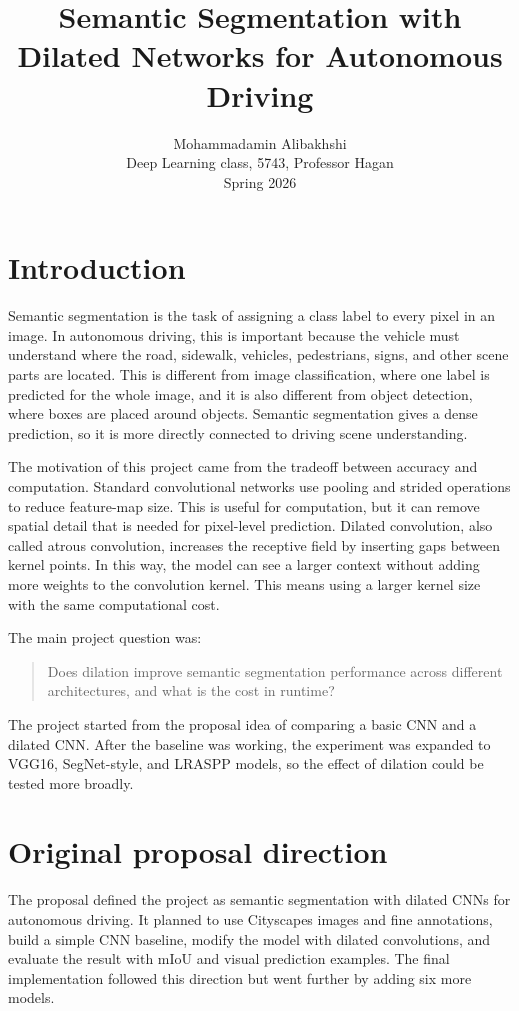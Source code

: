 \documentclass[12pt]{article}
\title{Semantic Segmentation with Dilated Networks for Autonomous Driving}
\author{Mohammadamin Alibakhshi\\Deep Learning class, 5743, Professor Hagan\\Spring 2026}
\date{}
\begin{document}
\maketitle
\section{Introduction}
Semantic segmentation is the task of assigning a class label to every pixel in an image. In autonomous driving, this is important because the vehicle must understand where the road, sidewalk, vehicles, pedestrians, signs, and other scene parts are located. This is different from image classification, where one label is predicted for the whole image, and it is also different from object detection, where boxes are placed around objects. Semantic segmentation gives a dense prediction, so it is more directly connected to driving scene understanding.

The motivation of this project came from the tradeoff between accuracy and computation. Standard convolutional networks use pooling and strided operations to reduce feature-map size. This is useful for computation, but it can remove spatial detail that is needed for pixel-level prediction. Dilated convolution, also called atrous convolution, increases the receptive field by inserting gaps between kernel points. In this way, the model can see a larger context without adding more weights to the convolution kernel. This means using a larger kernel size with the same computational cost. 

The main project question was:
\begin{quote}
Does dilation improve semantic segmentation performance across different architectures, and what is the cost in runtime?
\end{quote}

The project started from the proposal idea of comparing a basic CNN and a dilated CNN. After the baseline was working, the experiment was expanded to VGG16, SegNet-style, and LRASPP models, so the effect of dilation could be tested more broadly.

\section{Original proposal direction}
The proposal defined the project as semantic segmentation with dilated CNNs for autonomous driving. It planned to use Cityscapes images and fine annotations, build a simple CNN baseline, modify the model with dilated convolutions, and evaluate the result with mIoU and visual prediction examples. The final implementation followed this direction but went further by adding six more models.
\end{document}
